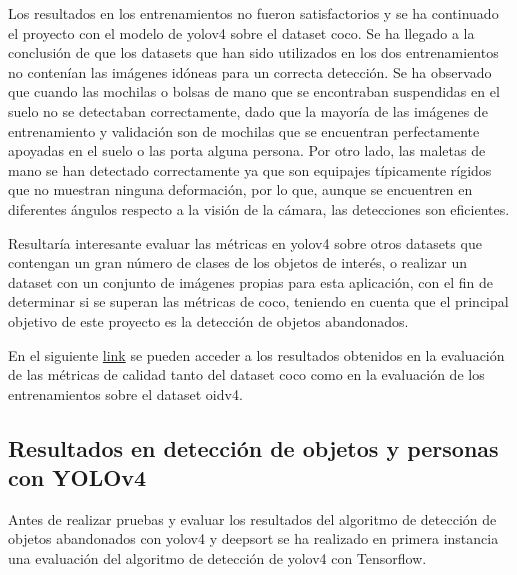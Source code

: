Los resultados en los entrenamientos no fueron satisfactorios y se ha continuado el proyecto con el modelo de \gls{yolov4} sobre el dataset \gls{coco}. Se ha llegado a la conclusión de que los datasets que han sido utilizados en los dos entrenamientos no contenían las imágenes idóneas para un correcta detección. Se ha observado que cuando las mochilas o bolsas de mano que se encontraban suspendidas en el suelo no se detectaban correctamente, dado que la mayoría de las imágenes de entrenamiento y validación son de mochilas que se encuentran perfectamente apoyadas en el suelo o las porta alguna persona. Por otro lado, las maletas de mano se han detectado correctamente ya que son equipajes típicamente rígidos que no muestran ninguna deformación, por lo que, aunque se encuentren en diferentes ángulos respecto a la visión de la cámara, las detecciones son eficientes.

Resultaría interesante evaluar las métricas en \gls{yolov4} sobre otros datasets que contengan un gran número de clases de los objetos de interés, o realizar un dataset con un conjunto de imágenes propias para esta aplicación, con el fin de determinar si se superan las métricas de \gls{coco}, teniendo en cuenta que el principal objetivo de este proyecto es la detección de objetos abandonados.

En el siguiente \href{https://drive.google.com/drive/folders/1ahdsjoDRICqDNB4dPGVYI6mVtYSDvvgu?usp=sharing}{link} se pueden acceder a los resultados obtenidos en la evaluación de las métricas de calidad tanto del dataset \gls{coco} como en la evaluación de los entrenamientos sobre el dataset \gls{oidv4}.

\subsection{Resultados en detección de objetos y personas con YOLOv4}
\label{subsec:resultados-yolov4-tf}

Antes de realizar pruebas y evaluar los resultados del algoritmo de detección de objetos abandonados con \gls{yolov4} y \gls{deepsort} se ha realizado en primera instancia una evaluación del algoritmo de detección de \gls{yolov4} con Tensorflow.

